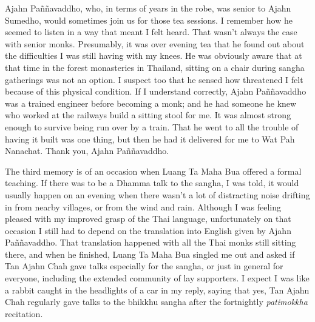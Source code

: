 Ajahn Paññavaddho, who, in terms of years in the robe, was senior to
Ajahn Sumedho, would sometimes join us for those tea sessions. I
remember how he seemed to listen in a way that meant I felt heard. That
wasn't always the case with senior monks. Presumably, it was over
evening tea that he found out about the difficulties I was still having
with my knees. He was obviously aware that at that time in the forest
monasteries in Thailand, sitting on a chair during sangha gatherings was
not an option. I suspect too that he sensed how threatened I felt
because of this physical condition. If I understand correctly, Ajahn
Paññavaddho was a trained engineer before becoming a monk; and he had
someone he knew who worked at the railways build a sitting stool for me.
It was almost strong enough to survive being run over by a train. That
he went to all the trouble of having it built was one thing, but then he
had it delivered for me to Wat Pah Nanachat. Thank you, Ajahn
Paññavaddho.

The third memory is of an occasion when Luang Ta Maha Bua offered a
formal teaching. If there was to be a Dhamma talk to the sangha, I was
told, it would usually happen on an evening when there wasn't a lot of
distracting noise drifting in from nearby villages, or from the wind and
rain. Although I was feeling pleased with my improved grasp of the Thai
language, unfortunately on that occasion I still had to depend on the
translation into English given by Ajahn Paññavaddho. That translation
happened with all the Thai monks still sitting there, and when he
finished, Luang Ta Maha Bua singled me out and asked if Tan Ajahn Chah
gave talks especially for the sangha, or just in general for everyone,
including the extended community of lay supporters. I expect I was like
a rabbit caught in the headlights of a car in my reply, saying that yes,
Tan Ajahn Chah regularly gave talks to the bhikkhu sangha after the
fortnightly \emph{patimokkha} recitation.

